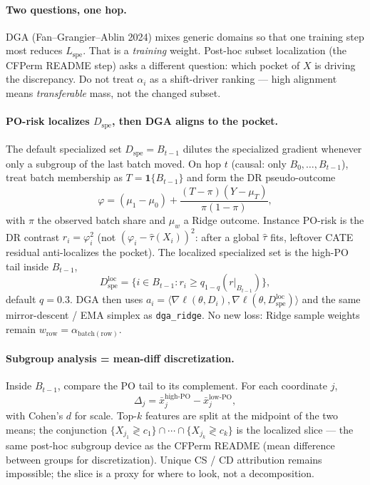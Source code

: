 
\paragraph{Two questions, one hop.}
DGA (Fan--Grangier--Ablin 2024) mixes generic domains so that one training
step most reduces $L_{\mathrm{spe}}$.
That is a \emph{training} weight.
Post-hoc subset localization (the CFPerm README step) asks a different
question: which pocket of $X$ is driving the discrepancy.
Do not treat $\alpha_i$ as a shift-driver ranking --- high alignment means
\emph{transferable} mass, not the changed subset.

\paragraph{PO-risk localizes $D_{\mathrm{spe}}$, then DGA aligns to the pocket.}
The default specialized set $D_{\mathrm{spe}}=B_{t-1}$ dilutes the specialized
gradient whenever only a subgroup of the last batch moved.
On hop $t$ (causal: only $B_0,\ldots,B_{t-1}$), treat batch membership as
$T=\mathbf{1}\{B_{t-1}\}$ and form the DR pseudo-outcome
\begin{equation}
  \varphi
  =
  (\mu_1-\mu_0)
  +
  \frac{(T-\pi)(Y-\mu_T)}{\pi(1-\pi)},
\end{equation}
with $\pi$ the observed batch share and $\mu_w$ a Ridge outcome.
Instance PO-risk is the DR contrast $r_i=\varphi_i^2$ (not
$(\varphi_i-\hat\tau(X_i))^2$: after a global $\hat\tau$ fits, leftover CATE
residual anti-localizes the pocket).
The localized specialized set is the high-PO tail inside $B_{t-1}$,
\[
  D_{\mathrm{spe}}^{\mathrm{loc}}
  =
  \{i\in B_{t-1}: r_i \ge q_{1-q}(r|_{B_{t-1}})\},
\]
default $q=0.3$.
DGA then uses $a_i=\langle\nabla\ell(\theta,D_i),\nabla\ell(\theta,D_{\mathrm{spe}}^{\mathrm{loc}})\rangle$
and the same mirror-descent / EMA simplex as \texttt{dga\_ridge}.
No new loss: Ridge sample weights remain $w_{\mathrm{row}}=\alpha_{\mathrm{batch(row)}}$.

\paragraph{Subgroup analysis = mean-diff discretization.}
Inside $B_{t-1}$, compare the PO tail to its complement.
For each coordinate $j$,
\[
  \Delta_j
  =
  \bar x_j^{\mathrm{high\text{-}PO}}
  -
  \bar x_j^{\mathrm{low\text{-}PO}},
\]
with Cohen's $d$ for scale.
Top-$k$ features are split at the midpoint of the two means; the conjunction
$\{X_{j_1}\gtrless c_1\}\cap\cdots\cap\{X_{j_k}\gtrless c_k\}$ is the
localized slice --- the same post-hoc subgroup device as the CFPerm
README (mean difference between groups for discretization).
Unique CS / CD attribution remains impossible; the slice is a proxy for
where to look, not a decomposition.

